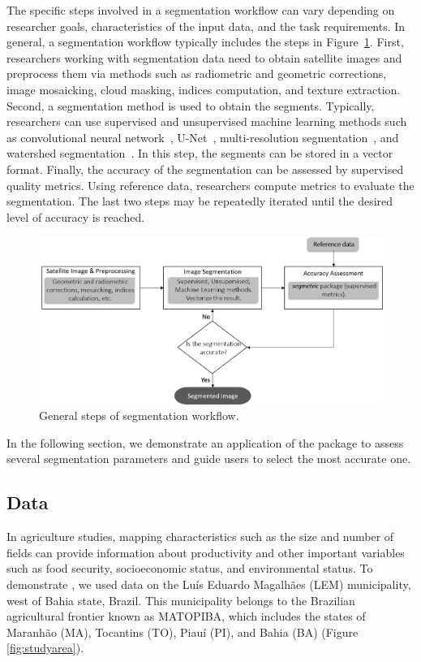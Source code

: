 The specific steps involved in a segmentation workflow can vary depending on researcher goals, characteristics of the input data, and the task requirements. In general, a segmentation workflow typically includes the steps in Figure~\ref{fig:workflow}. 
First, researchers working with segmentation data need to obtain satellite images and preprocess them via methods such as radiometric and geometric corrections, image mosaicking, cloud masking, indices computation, and texture extraction. 
Second, a segmentation method is used to obtain the segments. Typically, researchers can use supervised and unsupervised machine learning methods such as convolutional neural network~\citep{Fukushima1980}, U-Net~\citep{Ronneberger2015}, multi-resolution segmentation~\citep{Baatz2000}, and watershed segmentation~\citep{Beucher1992}. In this step, the segments can be stored in a vector format.
Finally, the accuracy of the segmentation can be assessed by supervised quality metrics. Using reference data, researchers compute metrics to evaluate the segmentation. 
The last two steps may be repeatedly iterated until the desired level of accuracy is reached.

\begin{figure}[htbp]
  \centering
  \includegraphics[width=1\textwidth]{fig2.png}
  \caption{General steps of segmentation workflow.}
  \label{fig:workflow}
\end{figure}

In the following section, we demonstrate an application of the  package to assess several segmentation parameters and guide users to select the most accurate one.

\subsection{Data}

In agriculture studies, mapping characteristics such as the size and number of fields can provide information about productivity and other important variables such as food security, socioeconomic status, and environmental status. To demonstrate , we used data on the Luís Eduardo Magalhães (LEM) municipality, west of Bahia state, Brazil. This municipality belongs to the Brazilian agricultural frontier known as MATOPIBA, which includes the states of Maranhão (MA), Tocantins (TO), Piauí (PI), and Bahia (BA) (Figure \ref{fig:studyarea}). 

